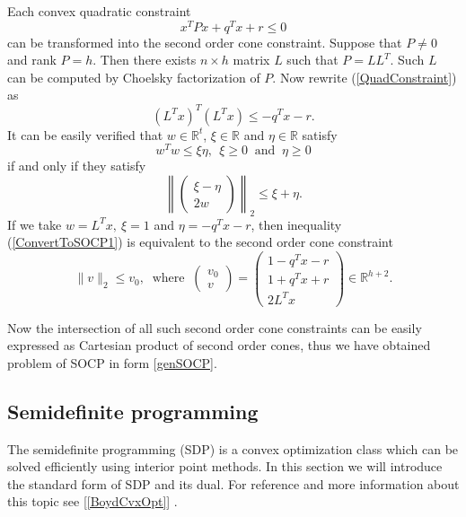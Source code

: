 \documentclass[10pt,oneside]{book}
\theoremstyle{definition}
\begin{document}
Each convex quadratic constraint 
\begin{equation}
\label{QuadConstraint}
x^TPx + q^Tx + r \leq 0
\end{equation} 
can be transformed into the second order cone constraint.  Suppose that $P\neq 0$ and rank $P = h.$ Then there exists $n\times h$ matrix $L$ such that $P=LL^T$. Such $L$ can be computed by Choelsky factorization of $P$. Now rewrite (\ref{QuadConstraint}) as 
\begin{equation}
\label{ConvertToSOCP1}
(L^Tx)^T(L^Tx)\leq -q^Tx - r.
\end{equation}
It can be easily verified that $w\in \mathbb{R}^t$, $\xi \in \mathbb{R}$ and $\eta \in \mathbb{R}$ satisfy
$$w^Tw\leq \xi\eta, \ \ \xi\geq 0\ \mbox{ and } \ \eta\geq 0$$
if and only if they satisfy
$$\left\|\left( \begin{array}{c}
\xi-\eta\\
2w
\end{array}\right)\right\|_2
\leq \xi+\eta . $$
If we take $w=L^Tx, \ \xi = 1$ and $\eta = -q^Tx - r$, then inequality (\ref{ConvertToSOCP1}) is equivalent to the second order cone constraint
\begin{equation}
\label{ConvertedQCintoSOCC}
 \|v\|_2\leq v_0, \ \mbox{  where  } \ \left(\begin{array}{c}
v_0\\
v
\end{array}\right) = 
\left(\begin{array}{c}
1- q^Tx - r\\
1 + q^Tx + r\\
2L^Tx
\end{array}\right)\in \mathbb{R}^{h+2}.
\end{equation}

Now the intersection of all such second order cone constraints can be easily expressed as Cartesian product of second order cones, thus we have obtained problem of SOCP in form \ref{genSOCP}. 


\subsection{Semidefinite programming}




The semidefinite programming (SDP) is a convex optimization class which can be solved efficiently using interior point methods. In this section we will introduce the standard form of SDP and its dual. For reference and more information about this topic see [\ref{BoydCvxOpt}] .
\end{document}
